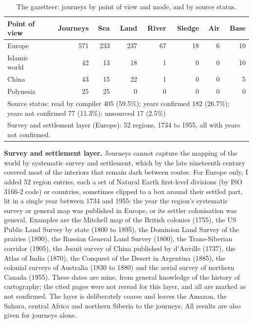 \documentclass[11pt,a4paper]{article}
\begin{document}
\begin{table}[tbp]\centering\small\caption{The gazetteer: journeys by point of view and mode, and by source status.}\label{tab:data}\begin{tabular}{lrrrrrrr}\toprule Point of view & Journeys & Sea & Land & River & Sledge & Air & Base\\\midrule
Europe & 571 & 233 & 237 & 67 & 18 & 6 & 10\\
Islamic world & 42 & 13 & 18 & 1 & 0 & 0 & 10\\
China & 43 & 15 & 22 & 1 & 0 & 0 & 5\\
Polynesia & 25 & 25 & 0 & 0 & 0 & 0 & 0\\
\midrule\multicolumn{8}{p{14cm}}{Source status: read by compiler 405 (59.5\%); years confirmed 182 (26.7\%); years not confirmed 77 (11.3\%); unsourced 17 (2.5\%)}\\
\multicolumn{8}{p{14cm}}{Survey and settlement layer (Europe): 52 regions, 1734 to 1955, all with years not confirmed.}\\
\bottomrule\end{tabular}\end{table}

\textbf{Survey and settlement layer.} Journeys cannot capture the mapping of the world by systematic survey and settlement, which by the late nineteenth century covered most of the interiors that remain dark between routes. For Europe only, I added 52 region entries, each a set of Natural Earth first-level divisions (by ISO 3166-2 code) or countries, sometimes clipped to a box around their settled part, lit in a single year between 1734 and 1955: the year the region's systematic survey or general map was published in Europe, or its settler colonisation was general. Examples are the Mitchell map of the British colonies (1755), the US Public Land Survey by state (1800 to 1895), the Dominion Land Survey of the prairies (1890), the Russian General Land Survey (1800), the Trans-Siberian corridor (1905), the Jesuit survey of China published by d'Anville (1737), the Atlas of India (1870), the Conquest of the Desert in Argentina (1885), the colonial surveys of Australia (1830 to 1880) and the aerial survey of northern Canada (1955). These dates are mine, from general knowledge of the history of cartography; the cited pages were not reread for this layer, and all are marked as not confirmed. The layer is deliberately coarse and leaves the Amazon, the Sahara, central Africa and northern Siberia to the journeys. All results are also given for journeys alone.
\end{document}
